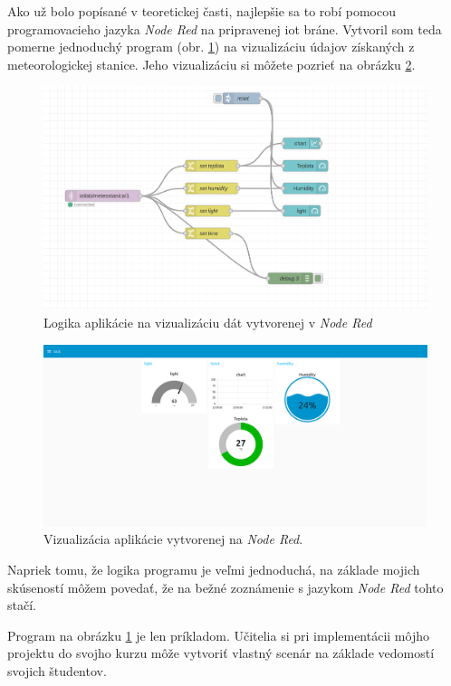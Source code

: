 Ako už bolo popísané v teoretickej časti, najlepšie sa to robí pomocou programovacieho jazyka \textit{Node Red} na pripravenej \gls{iot} bráne. Vytvoril som teda pomerne jednoduchý program (obr. \ref{node}) na vizualizáciu údajov získaných z meteorologickej stanice. Jeho vizualizáciu si môžete pozrieť na obrázku \ref{nodeVisual}.
\begin{figure}[!ht]
    \centering
    \includegraphics[width=\textwidth]{figures/node}
    \caption{Logika aplikácie na vizualizáciu dát vytvorenej v \textit{Node Red} \label{node}}
\end{figure}
\begin{figure}[!ht]
    \centering
    \includegraphics[width=\textwidth]{figures/node_obr}
    \caption{Vizualizácia aplikácie vytvorenej na \textit{Node Red}. \label{nodeVisual}}
\end{figure}
Napriek tomu, že logika programu je veľmi jednoduchá, na základe mojich skúseností môžem povedať, že na bežné zoznámenie s jazykom \textit{Node Red} tohto stačí. 

Program na obrázku \ref{node} je len príkladom. Učitelia si pri implementácii môjho projektu do svojho kurzu môže vytvoriť vlastný scenár na základe vedomostí svojich študentov.

